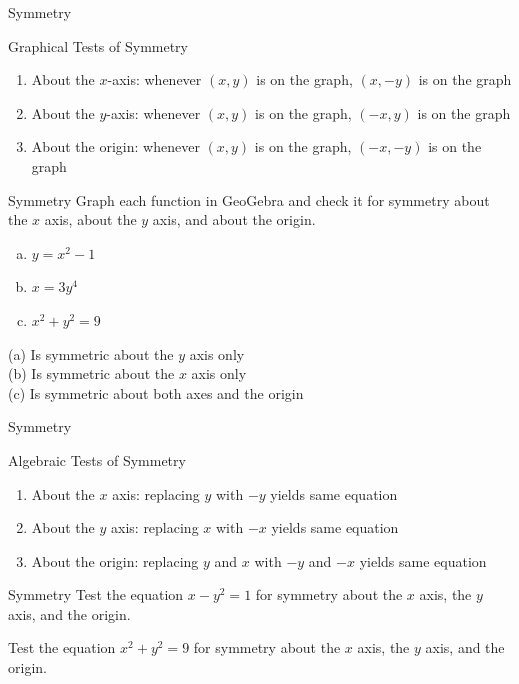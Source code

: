 \documentclass{beamer}
\begin{document}
\begin{frame}[t]{Symmetry}
\begin{block}{Graphical Tests of Symmetry}
\begin{enumerate}[1)]
\item About the $x$-axis: whenever $(x,y)$ is on the graph, $(x,-y)$ is on the graph
\item About the $y$-axis: whenever $(x,y)$ is on the graph, $(-x,y)$ is on the graph
\item About the origin: whenever $(x,y)$ is on the graph, $(-x,-y)$ is on the graph
\end{enumerate}
\end{block}
\end{frame}

\begin{frame}[t]{Symmetry}
Graph each function in GeoGebra and check it for symmetry about the $x$ axis, about the $y$ axis, and about the origin.
\begin{enumerate}[(a)]
\item $y = x^2 - 1$
\item $x = 3y^4$
\item $x^2 + y^2 = 9$
\end{enumerate}

\pause

(a) Is symmetric about the $y$ axis only \\ \pause
(b) Is symmetric about the $x$ axis only \\ \pause
(c) Is symmetric about both axes and the origin
\end{frame}

\begin{frame}[t]{Symmetry}
\begin{block}{Algebraic Tests of Symmetry}
\begin{enumerate}[1)]
\item About the $x$ axis: replacing $y$ with $-y$ yields same equation
\item About the $y$ axis: replacing $x$ with $-x$ yields same equation
\item About the origin: replacing $y$ and $x$ with $-y$ and $-x$ yields same equation
\end{enumerate}
\end{block}
\end{frame}

\begin{frame}[t]{Symmetry}
Test the equation $x - y^2 = 1$ for symmetry about the $x$ axis, the $y$ axis, and the origin.

\pause \vfill

Test the equation $x^2 + y^2 = 9$ for symmetry about the $x$ axis, the $y$ axis, and the origin.

\end{frame}
\end{document}
